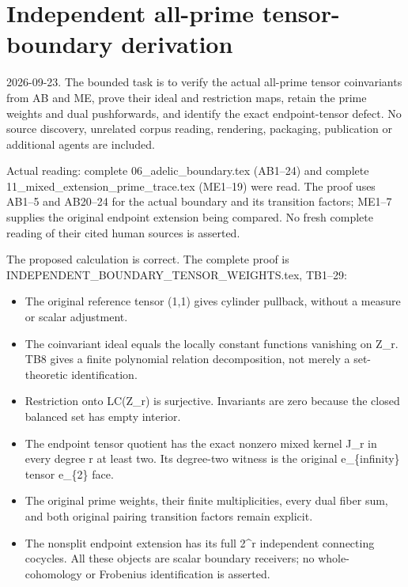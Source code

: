 \documentclass[
]{article}
\author{}
\date{}
\providecommand{\tightlist}{%
  \setlength{\itemsep}{0pt}\setlength{\parskip}{0pt}}
\begin{document}
\section{Independent all-prime tensor-boundary
derivation}\label{independent-all-prime-tensor-boundary-derivation}

2026-09-23. The bounded task is to verify the actual all-prime tensor
coinvariants from AB and ME, prove their ideal and restriction maps,
retain the prime weights and dual pushforwards, and identify the exact
endpoint-tensor defect. No source discovery, unrelated corpus reading,
rendering, packaging, publication or additional agents are included.

Actual reading: complete 06\_adelic\_boundary.tex (AB1--24) and complete
11\_mixed\_extension\_prime\_trace.tex (ME1--19) were read. The proof
uses AB1--5 and AB20--24 for the actual boundary and its transition
factors; ME1--7 supplies the original endpoint extension being compared.
No fresh complete reading of their cited human sources is asserted.

The proposed calculation is correct. The complete proof is
INDEPENDENT\_BOUNDARY\_TENSOR\_WEIGHTS.tex, TB1--29:

\begin{itemize}
\tightlist
\item
  The original reference tensor (1,1) gives cylinder pullback, without a
  measure or scalar adjustment.
\item
  The coinvariant ideal equals the locally constant functions vanishing
  on Z\_r. TB8 gives a finite polynomial relation decomposition, not
  merely a set-theoretic identification.
\item
  Restriction onto LC(Z\_r) is surjective. Invariants are zero because
  the closed balanced set has empty interior.
\item
  The endpoint tensor quotient has the exact nonzero mixed kernel J\_r
  in every degree r at least two. Its degree-two witness is the original
  e\_\{infinity\} tensor e\_\{2\} face.
\item
  The original prime weights, their finite multiplicities, every dual
  fiber sum, and both original pairing transition factors remain
  explicit.
\item
  The nonsplit endpoint extension has its full 2\^{}r independent
  connecting cocycles. All these objects are scalar boundary receivers;
  no whole-cohomology or Frobenius identification is asserted.
\end{itemize}
\end{document}
